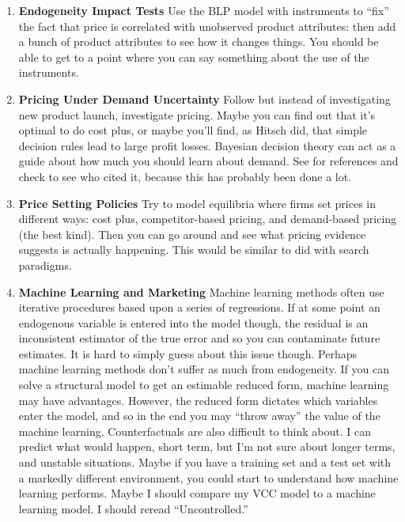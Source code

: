 \documentclass[paper=a4, fontsize=11pt]{scrartcl} %
\numberwithin{equation}{section} %
\numberwithin{figure}{section} %
\numberwithin{table}{section} %
\begin{document}
\begin{enumerate}
\item \textbf{Endogeneity Impact Tests} Use the BLP model with instruments to ``fix'' the fact that price is correlated with unobserved product attributes: then add a bunch of product attributes to see how it changes things.  You should be able to get to a point where you can say something about the use of the instruments.  

\item \textbf{Pricing Under Demand Uncertainty} Follow \cite{hitsch2006empirical} but instead of investigating new product launch, investigate pricing.  Maybe you can find out that it's optimal to do cost plus, or maybe you'll find, as Hitsch did, that simple decision rules lead to large profit losses.  Bayesian decision theory can act as a guide about how much you should learn about demand.  See \cite{hitsch2006empirical} for references and check to see who cited it, because this has probably been done a lot.

\item \textbf{Price Setting Policies}  Try to model equilibria where firms set prices in different ways: cost plus, competitor-based pricing, and demand-based pricing (the best kind).  Then you can go around and see what pricing evidence suggests is actually happening.  This would be similar to \cite{delossantos} did with search paradigms. 

\item \textbf{Machine Learning and Marketing}  Machine learning methods often use iterative procedures based upon a series of regressions.  If at some point an endogenous variable is entered into the model though, the residual is an inconsistent estimator of the true error and so you can contaminate future estimates.  It is hard to simply guess about this issue though.  Perhaps machine learning methods don't suffer as much from endogeneity.  
	If you can solve a structural model to get  an estimable reduced form, machine learning may have advantages.  However, the reduced form dictates which variables enter the model, and so in the end you may ``throw away'' the value of the machine learning.  
	Counterfactuals are also difficult to think about.  I can predict what would happen, short term, but I'm not sure about longer terms, and unstable situations.  Maybe if you have a training set and a test set with a markedly different environment, you could start to understand how machine learning performs.  Maybe I should compare my VCC model to a machine learning model.
	I should reread ``Uncontrolled.''


\end{enumerate}
\end{document}
